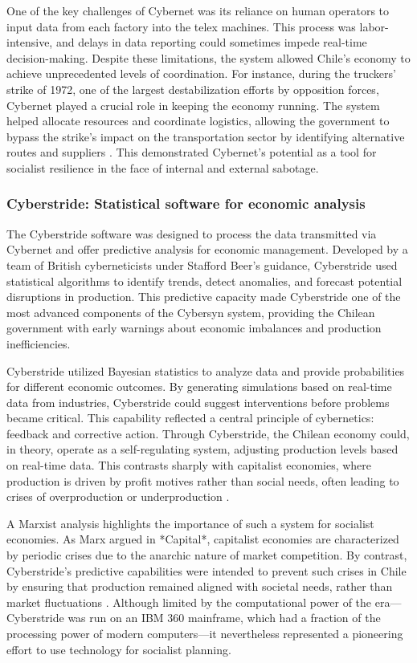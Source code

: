 \begin{refsection}
One of the key challenges of Cybernet was its reliance on human operators to input data from each factory into the telex machines. This process was labor-intensive, and delays in data reporting could sometimes impede real-time decision-making. Despite these limitations, the system allowed Chile’s economy to achieve unprecedented levels of coordination. For instance, during the truckers' strike of 1972, one of the largest destabilization efforts by opposition forces, Cybernet played a crucial role in keeping the economy running. The system helped allocate resources and coordinate logistics, allowing the government to bypass the strike's impact on the transportation sector by identifying alternative routes and suppliers \cite[pp.~231-234]{harmer2011}. This demonstrated Cybernet’s potential as a tool for socialist resilience in the face of internal and external sabotage.

\subsubsection{Cyberstride: Statistical software for economic analysis}

The Cyberstride software was designed to process the data transmitted via Cybernet and offer predictive analysis for economic management. Developed by a team of British cyberneticists under Stafford Beer’s guidance, Cyberstride used statistical algorithms to identify trends, detect anomalies, and forecast potential disruptions in production. This predictive capacity made Cyberstride one of the most advanced components of the Cybersyn system, providing the Chilean government with early warnings about economic imbalances and production inefficiencies.

Cyberstride utilized Bayesian statistics to analyze data and provide probabilities for different economic outcomes. By generating simulations based on real-time data from industries, Cyberstride could suggest interventions before problems became critical. This capability reflected a central principle of cybernetics: feedback and corrective action. Through Cyberstride, the Chilean economy could, in theory, operate as a self-regulating system, adjusting production levels based on real-time data. This contrasts sharply with capitalist economies, where production is driven by profit motives rather than social needs, often leading to crises of overproduction or underproduction \cite[pp.~134-137]{medina2014}. 

A Marxist analysis highlights the importance of such a system for socialist economies. As Marx argued in *Capital*, capitalist economies are characterized by periodic crises due to the anarchic nature of market competition. By contrast, Cyberstride's predictive capabilities were intended to prevent such crises in Chile by ensuring that production remained aligned with societal needs, rather than market fluctuations \cite[pp.~701-705]{marx2008}. Although limited by the computational power of the era—Cyberstride was run on an IBM 360 mainframe, which had a fraction of the processing power of modern computers—it nevertheless represented a pioneering effort to use technology for socialist planning.


\end{refsection}
